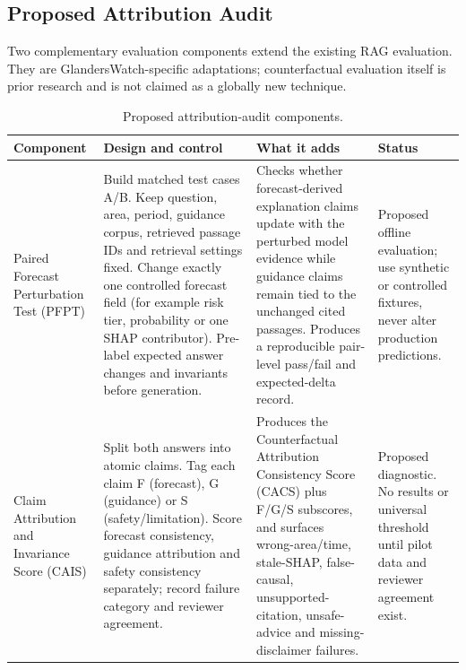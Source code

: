 \documentclass[10pt,openany]{report}
\begin{document}
\subsection{Proposed Attribution Audit}

Two complementary evaluation components extend the existing RAG evaluation. They are
GlandersWatch-specific adaptations; counterfactual evaluation itself is prior research
\cite{counterfactualrag2026,attrbias2024} and is not claimed as a globally new technique.

\begin{table}[htbp]
\centering
\caption{Proposed attribution-audit components.}
\label{tab:pfpt-cais}
\small
\begin{tabular}{@{}>{\raggedright\arraybackslash}p{2.8cm}
                >{\raggedright\arraybackslash}p{5.0cm}
                >{\raggedright\arraybackslash}p{4.0cm}
                >{\raggedright\arraybackslash}p{2.2cm}@{}}
\toprule
\textbf{Component} & \textbf{Design and control} & \textbf{What it adds} & \textbf{Status} \\
\midrule
Paired Forecast Perturbation Test (PFPT) &
Build matched test cases A/B. Keep question, area, period, guidance corpus, retrieved passage IDs and retrieval settings fixed. Change exactly one controlled forecast field (for example risk tier, probability or one SHAP contributor). Pre-label expected answer changes and invariants before generation. &
Checks whether forecast-derived explanation claims update with the perturbed model evidence while guidance claims remain tied to the unchanged cited passages. Produces a reproducible pair-level pass/fail and expected-delta record. &
Proposed offline evaluation; use synthetic or controlled fixtures, never alter production predictions. \\
Claim Attribution and Invariance Score (CAIS) &
Split both answers into atomic claims. Tag each claim F (forecast), G (guidance) or S (safety/limitation). Score forecast consistency, guidance attribution and safety consistency separately; record failure category and reviewer agreement. &
Produces the Counterfactual Attribution Consistency Score (CACS) plus F/G/S subscores, and surfaces wrong-area/time, stale-SHAP, false-causal, unsupported-citation, unsafe-advice and missing-disclaimer failures. &
Proposed diagnostic. No results or universal threshold until pilot data and reviewer agreement exist. \\
\bottomrule
\end{tabular}
\end{table}
\end{document}
